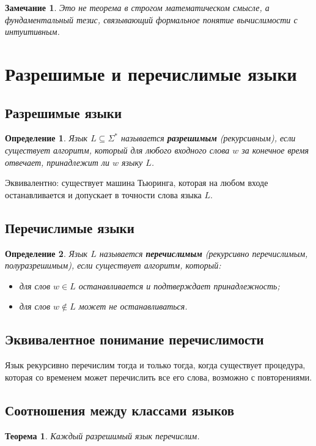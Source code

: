 \documentclass[12pt,a4paper]{article}
\newtheorem{definition}{Определение}
\newtheorem{theorem}{Теорема}
\newtheorem{remark}{Замечание}
\begin{document}
\begin{remark}
Это не теорема в строгом математическом смысле, а фундаментальный тезис, связывающий формальное понятие вычислимости с интуитивным.
\end{remark}

\section{Разрешимые и перечислимые языки}

\subsection{Разрешимые языки}
\begin{definition}
Язык $L\subseteq\Sigma^*$ называется \textbf{разрешимым} (рекурсивным), если существует алгоритм, который для любого входного слова $w$ за конечное время отвечает, принадлежит ли $w$ языку $L$.
\end{definition}

Эквивалентно: существует машина Тьюринга, которая на любом входе останавливается и допускает в точности слова языка $L$.

\subsection{Перечислимые языки}
\begin{definition}
Язык $L$ называется \textbf{перечислимым} (рекурсивно перечислимым, полуразрешимым), если существует алгоритм, который:
\begin{itemize}
    \item для слов $w\in L$ останавливается и подтверждает принадлежность;
    \item для слов $w\notin L$ может не останавливаться.
\end{itemize}
\end{definition}

\subsection{Эквивалентное понимание перечислимости}
Язык рекурсивно перечислим тогда и только тогда, когда существует процедура, которая со временем может перечислить все его слова, возможно с повторениями.

\subsection{Соотношения между классами языков}
\begin{theorem}
Каждый разрешимый язык перечислим.
\end{theorem}
\end{document}
